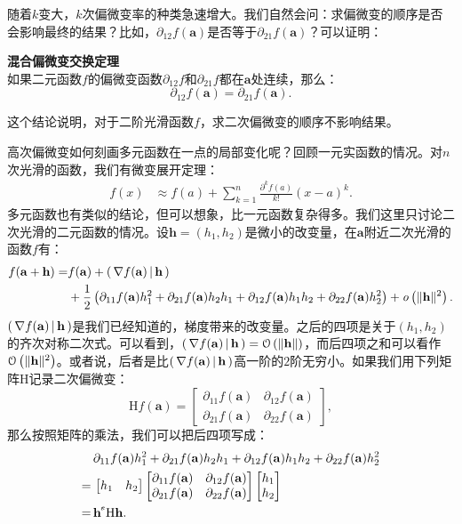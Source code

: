 \documentclass[12pt,UTF8]{ctexbook}
\begin{document}
随着$k$变大，$k$次偏微变率的种类急速增大。我们自然会问：求偏微变的顺序是否会影响最终的结果？比如，$\partial_{12} f(\mathbf{a})$是否等于$\partial_{21} f(\mathbf{a})$？可以证明：
\begin{tm}{\textbf{混合偏微变交换定理}}\\
    如果二元函数$f$的偏微变函数$\partial_{12} f$和$\partial_{21} f$都在$\mathbf{a}$处连续，那么：
    $$ \partial_{12} f(\mathbf{a}) = \partial_{21} f(\mathbf{a}).$$
\end{tm}
这个结论说明，对于二阶光滑函数$f$，求二次偏微变的顺序不影响结果。


高次偏微变如何刻画多元函数在一点的局部变化呢？回顾一元实函数的情况。对$n$次光滑的函数，我们有微变展开定理：
\begin{align*}
    f(x) &\approx f(a) + \sum_{k=1}^n \frac{\partial^k f (a)}{k!}(x - a)^k .
\end{align*}
多元函数也有类似的结论，但可以想象，比一元函数复杂得多。我们这里只讨论二次光滑的二元函数的情况。设$\mathbf{h} = (h_1,h_2)$是微小的改变量，在$\mathbf{a}$附近二次光滑的函数$f$有：
\begin{align*}
    f(\mathbf{a} + \mathbf{h}) = & f(\mathbf{a}) + \displaystyle\left( \,\nabla f(\mathbf{a}) \,\middle\vert \,\mathbf{h} \,\right) \\
    &+ \frac{1}{2} \left(\partial_{11} f(\mathbf{a})h_1^2 + \partial_{21} f(\mathbf{a})h_2h_1 + \partial_{12} f(\mathbf{a})h_1h_2 + \partial_{22} f(\mathbf{a})h_2^2\right) + \mathit{o}\left(\|\mathbf{h}\|^2\right).
\end{align*}
$\displaystyle\left( \,\nabla f(\mathbf{a}) \,\middle\vert \,\mathbf{h} \,\right)$是我们已经知道的，梯度带来的改变量。之后的四项是关于$(h_1,h_2)$的齐次对称二次式。可以看到，$\displaystyle\left( \,\nabla f(\mathbf{a}) \,\middle\vert \,\mathbf{h} \,\right) = \mathcal{O}\left(\|\mathbf{h}\|\right)$，而后四项之和可以看作$\mathcal{O}\left(\|\mathbf{h}\|^2\right)$。或者说，后者是比$\displaystyle\left( \,\nabla f(\mathbf{a}) \,\middle\vert \,\mathbf{h} \,\right)$高一阶的$2$阶无穷小。如果我们用下列矩阵$\mathrm{H}$记录二次偏微变：
$$
 \mathrm{H}f(\mathbf{a}) = \begin{bmatrix} \partial_{11} f(\mathbf{a}) & \partial_{12} f(\mathbf{a}) \\ \partial_{21} f(\mathbf{a}) & \partial_{22} f(\mathbf{a}) \end{bmatrix} , 
$$
那么按照矩阵的乘法，我们可以把后四项写成：
\begin{align*}
    &\partial_{11} f(\mathbf{a})h_1^2 + \partial_{21} f(\mathbf{a})h_2h_1 + \partial_{12} f(\mathbf{a})h_1h_2 + \partial_{22} f(\mathbf{a})h_2^2 \\
    =\,& \begin{bmatrix}
h_1 & h_2
\end{bmatrix}\begin{bmatrix} \partial_{11} f(\mathbf{a}) & \partial_{12} f(\mathbf{a}) \\ \partial_{21} f(\mathbf{a}) & \partial_{22} f(\mathbf{a}) \end{bmatrix} \begin{bmatrix}
h_1\\h_2
\end{bmatrix}\\
=\,&\mathbf{h}^{\tr} \mathrm{H} \mathbf{h}.
\end{align*}
\end{document}
